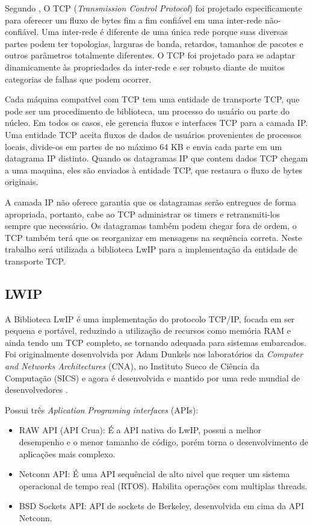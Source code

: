 Segundo , O TCP (\textit{Transmission Control Protocol}) foi projetado especificamente para oferecer um fluxo de bytes fim a fim confiável em uma inter-rede não-confiável. Uma inter-rede é diferente de uma única rede porque suas diversas partes podem ter topologias, larguras de banda, retardos, tamanhos de pacotes e outros parâmetros totalmente diferentes. O TCP foi projetado para se adaptar dinamicamente às propriedades da inter-rede e ser robusto diante de muitos categorias de falhas que podem ocorrer.

Cada máquina compatível com TCP tem uma entidade de transporte TCP, que pode ser um procedimento de biblioteca, um processo do usuário ou parte do núcleo. Em todos os casos, ele gerencia fluxos e interfaces TCP para a camada IP. Uma entidade TCP aceita fluxos de dados de usuários provenientes de processos locais, divide-os em partes de no máximo 64 KB e envia cada parte em um datagrama IP distinto. Quando os datagramas IP que contem dados TCP chegam a uma maquina, eles são enviados à entidade TCP, que restaura o fluxo de bytes originais.

A camada IP não oferece garantia que os datagramas serão entregues de forma apropriada, portanto, cabe ao TCP administrar os timers e retransmiti-los sempre que necessário. Os datagramas também podem chegar fora de ordem, o TCP também terá que os reorganizar em mensagens na sequência correta. Neste trabalho será utilizada a biblioteca LwIP para a implementação da entidade de transporte TCP.

\subsection{LWIP}
A Biblioteca LwIP é uma implementação do protocolo TCP/IP, focada em ser pequena e portável, reduzindo a utilização de recursos como memória RAM e ainda tendo um TCP completo, se tornando adequada para sistemas embarcados. Foi originalmente desenvolvida por Adam Dunkels nos laboratórios da \textit{Computer and Networks Architectures} (CNA), no Instituto Sueco de Ciência da Computação (SICS) e agora é desenvolvida e mantido por uma rede mundial de desenvolvedores \cite{LWIP}.

Possui três \textit{Aplication Programing interfaces} (APIs):
\begin{itemize}
\item RAW API (API Crua): É a API nativa do LwIP, possui a melhor desempenho e o menor tamanho de código, porém torna o desenvolvimento de aplicações mais complexo.
\item Netconn API: É uma API sequêncial de alto nivel que requer um sistema operacional de tempo real (RTOS). Habilita operações com multiplas threads.
\item BSD Sockets API: API de sockets de Berkeley, desenvolvida em cima da API Netconn.
\end{itemize}





